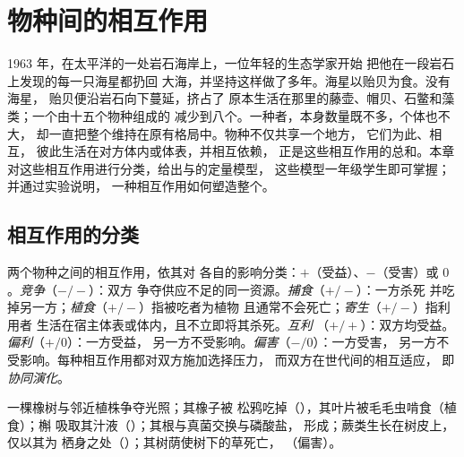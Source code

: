 \chapter{物种间的相互作用}\label{ch:b1:species-interactions}

1963 年，在太平洋的一处岩石海岸上，一位年轻的生态学家开始
把他在一段岩石上发现的每一只海星都扔回
大海，并坚持这样做了多年。海星以贻贝为食。没有海星，
贻贝便沿岩石向下蔓延，挤占了
原本生活在那里的藤壶、帽贝、石鳖和藻类；一个由十五个物种组成的
减少到八个。一种者，本身数量既不多，个体也不大，
却一直把整个维持在原有格局中。物种不仅共享一个地方，
它们为此、相互，
彼此生活在对方体内或体表，并相互依赖，
正是这些相互作用的总和。本章
对这些相互作用进行分类，给出与的定量模型，
这些模型一年级学生即可掌握；并通过实验说明，
一种相互作用如何塑造整个。

\section{相互作用的分类}

\begin{definition}[种间相互作用]\label{def:b1:species-interactions:types}
两个物种之间的相互作用，依其对
各自的影响分类：$+$（受益）、$-$（受害）或 $0$。\emph{竞争}（$-/-$）：双方
争夺供应不足的同一资源。\emph{捕食}（$+/-$）：一方杀死
并吃掉另一方；\emph{植食}（$+/-$）指被吃者为植物
且通常不会死亡；\emph{寄生}（$+/-$）指利用者
生活在宿主体表或体内，且不立即将其杀死。\emph{互利}
（$+/+$）：双方均受益。\emph{偏利}（$+/0$）：一方受益，
另一方不受影响。\emph{偏害}（$-/0$）：一方受害，
另一方不受影响。每种相互作用都对双方施加选择压力，
而双方在世代间的相互适应，
即\emph{协同演化}。
\end{definition}

\begin{example}\label{ex:b1:species-interactions:oak}
一棵橡树与邻近植株争夺光照；其橡子被
松鸦吃掉（），其叶片被毛毛虫啃食（植食）；槲
吸取其汁液（）；其根与真菌交换与磷酸盐，
形成；蕨类生长在树皮上，仅以其为
栖身之处（）；其树荫使树下的草死亡，
（偏害）。
\end{example}

